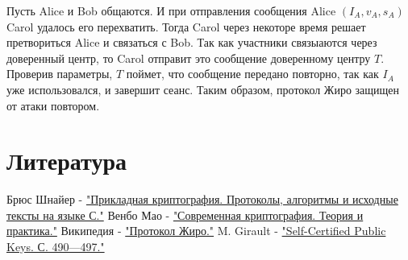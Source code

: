 \documentclass[a4paper]{article}
\begin{document}
\par Пусть Alice и Bob общаются. И при отправления сообщения Alice $(I_A, v_A, s_A)$ Carol удалось его перехватить. Тогда Carol через некоторе время решает претвориться Alice и связаться с Bob. Так как участники связыаются через доверенный центр, то Carol отправит это сообщение доверенному центру $T$. 
Проверив параметры, $T$ поймет, что сообщение передано повторно, так как $I_A$ уже использовался, и завершит сеанс. Таким образом, протокол Жиро защищен от атаки повтором.
\section{Литература}

\begin{thebibliography}{}
      Брюс Шнайер -  \href{https://lib.mipt.ru/book/n/00013022000cdbe8096da0a688d3a130/Shnaier-B-Prikladnaya-kriptografiya-Protokoly-algoritmy-i-ishodnye-teksty-na-yazyke-S.pdf}{"Прикладная криптография. Протоколы, алгоритмы и исходные тексты на языке С."}
      Венбо Мао -  \href{https://lib.mipt.ru/book/266371/?q=+криптографические+протоколы}{"Современная криптография. Теория и практика."}
      Википедия -  \href{https://ru.wikipedia.org/wiki/Протокол_Жиро}{"Протокол Жиро."}
      M. Girault -  \href{https://doi.org/10.1007/3-540-46416-6_42}{"Self-Certified Public Keys. С. 490—497."}
\end{thebibliography}
\end{document}
